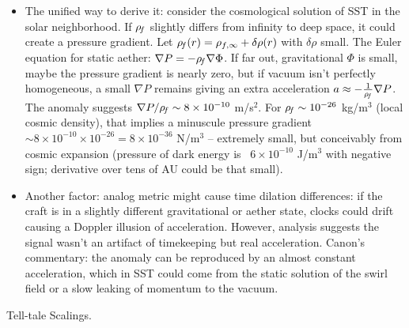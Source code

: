 \documentclass[11pt]{article}
\begin{document}
\begin{itemize}
\item 
The unified way to derive it: consider the cosmological solution of SST in the solar neighborhood. If $\rho_{\!f}$ slightly differs from infinity to deep space, it could create a pressure gradient. Let $\rho_{\!f}(r) = \rho_{f,\infty} + \delta \rho(r)$ with $\delta \rho$ small. The Euler equation for static aether: $\nabla P = -\rho_{\!f} \nabla \Phi$. If far out, gravitational $\Phi$ is small, maybe the pressure gradient is nearly zero, but if vacuum isn’t perfectly homogeneous, a small $\nabla P$ remains giving an extra acceleration $a \approx -\frac{1}{\rho_{\!f}}\nabla P$. The anomaly suggests $\nabla P/\rho_{\!f} \sim 8\times10^{-10}$ m/s$^2$. For $\rho_{\!f} \sim 10^{-26}$ kg/m$^3$ (local cosmic density), that implies a minuscule pressure gradient $\sim8\times10^{-10}\times10^{-26} = 8\times10^{-36}$ N/m$^3$ – extremely small, but conceivably from cosmic expansion (pressure of dark energy is ~$6\times10^{-10}$ J/m$^3$ with negative sign; derivative over tens of AU could be that small).




\item 
Another factor: analog metric might cause time dilation differences: if the craft is in a slightly different gravitational or aether state, clocks could drift causing a Doppler illusion of acceleration. However, analysis suggests the signal wasn’t an artifact of timekeeping but real acceleration. Canon’s commentary: the anomaly can be reproduced by an almost constant acceleration, which in SST could come from the static solution of the swirl field or a slow leaking of momentum to the vacuum.




\end{itemize}

Tell-tale Scalings.
\end{document}
